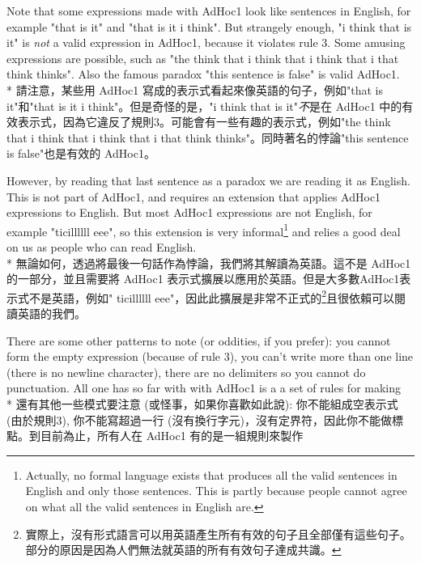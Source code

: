\documentclass[]{article}
\begin{document}
{\color{gray}Note that some expressions made with AdHoc1 look like sentences in English, for example "that is it" and "that is it i think". But strangely enough, "i think that is it" is \emph{not} a valid expression in AdHoc1, because it violates rule 3. Some amusing expressions are possible, such as "the think that i think that i think that i that think thinks". Also the famous paradox "this sentence is false" is valid AdHoc1.}
\\*
{請注意，某些用 AdHoc1 寫成的表示式看起來像英語的句子，例如"that is it"和"that is it i think"。但是奇怪的是，"i think that is it"\emph{不}是在 AdHoc1 中的有效表示式，因為它違反了規則3。可能會有一些有趣的表示式，例如"the think that i think that i think that i that think thinks"。同時著名的悖論"this sentence is false"也是有效的 AdHoc1。}

{\color{gray}However, by reading that last sentence as a paradox we are reading it as English. This is not part of AdHoc1, and requires an extension that applies AdHoc1 expressions to English. But most AdHoc1 expressions are not English, for example "ticillllll eee", so this extension is very informal\footnote{{\color{gray}Actually, no formal language exists that produces all the valid sentences in English and only those sentences. This is partly because people cannot agree on what all the valid sentences in English are.}} and relies a good deal on us as people who can read English.}
\\*
{無論如何，透過將最後一句話作為悖論，我們將其解讀為英語。這不是 AdHoc1 的一部分，並且需要將 AdHoc1 表示式擴展以應用於英語。但是大多數AdHoc1表示式不是英語，例如" ticillllll eee"，因此此擴展是非常不正式的\footnote{實際上，沒有形式語言可以用英語產生所有有效的句子且全部僅有這些句子。部分的原因是因為人們無法就英語的所有有效句子達成共識。}且很依賴可以閱讀英語的我們。}

{\color{gray}There are some other patterns to note (or oddities, if you prefer): you cannot form the empty expression (because of rule 3), you can't write more than one line (there is no newline character), there are no delimiters so you cannot do punctuation. All one has so far {\color{cyan}with with} AdHoc1 is {\color{cyan}a a} set of rules for {\color{cyan}making}}
\\*
{還有其他一些模式要注意 (或怪事，如果你喜歡如此說): 你不能組成空表示式 (由於規則3), 你不能寫超過一行 (沒有換行字元)，沒有定界符，因此你不能做標點。到目前為止，所有人在 AdHoc1 有的是一組規則來製作}
\end{document}
